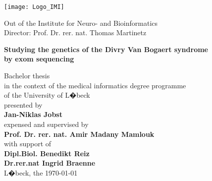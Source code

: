 
\addtolength{\topmargin}{-1.2cm} 
\addtolength{\textwidth}{2.35cm} 

\vspace*{-2.7cm}
\texttt{[image: Logo\_IMI]}
\vspace*{0.4cm}
\begin{center}


\enlargethispage{5cm}
Out of the Institute for Neuro- and Bioinformatics \\
Director: Prof. Dr. rer. nat. Thomas Martinetz\\[1.8cm]
%
\begin{large}
\textcolor{Ocean}{{\textbf{Studying the genetics of the Divry Van Bogaert syndrome } }}\\ %
\textcolor{Ocean}{{\textbf {by exom sequencing } }}\\ %

\end{large}

\vspace*{2.5cm}
%
Bachelor thesis\\ 
in the context of the medical informatics degree programme\\
of the University of L�beck\\[1.0cm]
%
presented by\\[0.1cm]
\textbf{Jan-Niklas Jobst}\\[1.0cm]
%
expensed and supervised by\\[0.1cm]
\textbf{Prof. Dr. rer. nat. Amir Madany Mamlouk}\\[0.3cm]
with support of \\[0.1cm]
\textbf{Dipl.Biol. Benedikt Reiz}\\
\textbf{Dr.rer.nat Ingrid Braenne}\\[2.8cm]
%
L�beck, the \today
\end{center}
  



\newpage
\thispagestyle{empty}

\addtolength{\topmargin}{1.2cm} 
\addtolength{\textwidth}{-2.35cm} 
